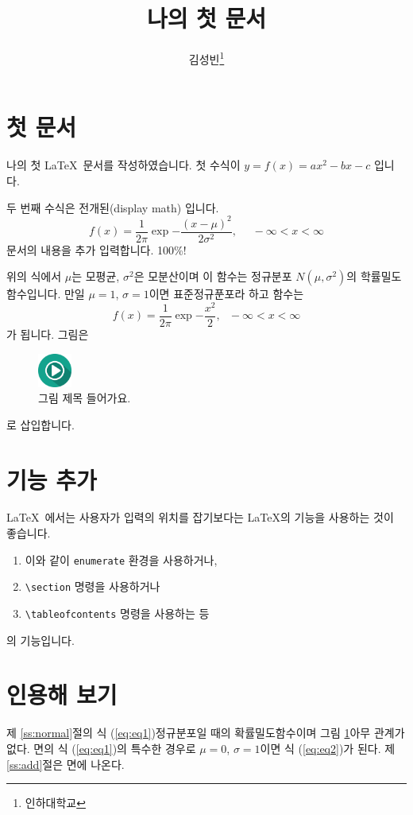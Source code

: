 \documentclass[11pt]{article}
\title{나의 첫 문서}
\author{김성빈\thanks{인하대학교}}
\begin{document}
\maketitle
\tableofcontents
\section{첫 문서\label{ss:normal}}
나의 첫 \LaTeX\ 문서를 작성하였습니다. 첫 수식이 $y=f(x)=ax^2-bx-c$ 입니다.

두 번째 수식은 전개된(display math) 입니다.
\begin{equation} \label{eq:eq1}
f(x) = \frac{1}{2\pi} \exp{-\frac{(x-\mu)^2}{2\sigma^2}}, \ \ \ \ \ \  -\infty < x < \infty
\end{equation}
문서의 내용을 추가 입력합니다. 100\%!

위의 식에서 $\mu$는 모평균, $\sigma^2$은 모분산이며 이 함수는 정규분포 $N(\mu, \sigma^2)$의 학률밀도함수입니다. 만일 $\mu=1$, $\sigma=1$이면 표준정규푼포라 하고 함수는
\begin{equation} \label{eq:eq2}
f(x)=\frac{1}{2\pi} \exp{-\frac{x^2}{2}}, \ \ \ -\infty < x < \infty
\end{equation}
가 됩니다. 그림은
\begin{figure}
\begin{center}
\includegraphics[width=3em]{../images/play.png}
\end{center}
\caption{그림 제목 들어가요.\label{fig:play}}
\end{figure}
로 삽입합니다.

\section{기능 추가\label{ss:add}}
\LaTeX\ 에서는 사용자가 입력의 위치를 잡기보다는 \LaTeX 의 기능을 사용하는 것이 좋습니다.
\begin{enumerate}
\item 이와 같이 \texttt{enumerate} 환경을 사용하거나,
\item \verb|\section| 명령을 사용하거나
\item \verb|\tableofcontents| 명령을 사용하는 등
\end{enumerate}
의 기능입니다.

\section{인용해 보기}
제 \ref{ss:normal}절의 식 (\ref{eq:eq1})\은 정규분포일 때의 확률밀도함수이며 그림 \ref{fig:play} 아무 관계가 없다. \pageref{eq:eq1}면의 식 (\ref{eq:eq1})의 특수한 경우로 $\mu=0$, $\sigma=1$이면 식 (\ref{eq:eq2})가 된다. 제 \ref{ss:add}절은 \pageref{ss:add}면에 나온다.

\end{document}
